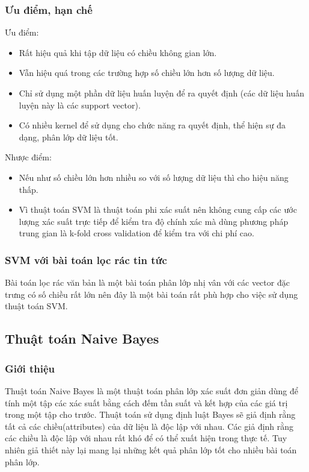 \subsubsection{Ưu điểm, hạn chế}
		Ưu điểm:
		\begin{itemize}
			\item Rất hiệu quả khi tập dữ liệu có chiều không gian lớn.
			\item Vẫn hiệu quá trong các trường hợp số chiều lớn hơn số lượng dữ liệu.
      \item Chỉ sử dụng một phần dữ liệu huấn luyện để ra quyết định (các dữ liệu huấn luyện này là các support vector).
      \item Có nhiều kernel để sử dụng cho chức năng ra quyết định, thể hiện sự đa dạng, phân lớp dữ liệu tốt.
		\end{itemize}
		Nhược điểm:
		\begin{itemize}
			\item Nếu như số chiều lớn hơn nhiều so với số lượng dữ liệu thì cho hiệu năng thấp.
			\item Vì thuật toán SVM là thuật toán phi xác suất nên không cung cấp các ước lượng xác suất trực tiếp để kiểm tra độ chính xác mà dùng phương pháp trung gian là k-fold cross validation để kiểm tra với chi phí cao.
		\end{itemize}
\subsubsection{SVM với bài toán lọc rác tin tức}
Bài toán lọc rác văn bản là một bài toán phân lớp nhị vân với các vector đặc trưng có số chiều rất lớn nên đây là một bài toán rất phù hợp cho việc sử dụng thuật toán SVM. 
\subsection{Thuật toán Naive Bayes} 
\subsubsection{Giới thiệu}
Thuật toán Naive Bayes là một thuật toán phân lớp xác suất đơn giản dùng để tính một tập các xác suất bằng cách đếm tần suất và kết hợp của các giá trị trong một tập cho trước\cite{dimitoglou2012comparison}. Thuật toán sử dụng định luật Bayes sẽ giả định rằng tất cả các chiều(attributes) của dữ liệu là độc lập với nhau. Các giả định rằng các chiều là độc lập với nhau rất khó để có thể xuất hiện trong thực tế. Tuy nhiên giả thiết này lại mang lại những kết quả phân lớp tốt cho nhiều bài toán phân lớp.

